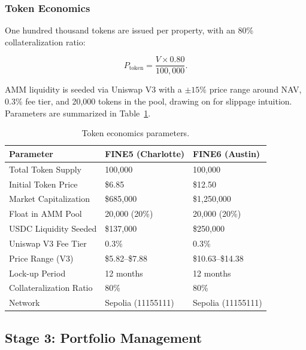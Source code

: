 \documentclass[11pt,letterpaper]{article}
\begin{document}
\subsubsection{Token Economics}

One hundred thousand tokens are issued per property, with an 80\% collateralization ratio:
\begin{eqbox}
\begin{equation}
P_{\text{token}} = \frac{V \times 0.80}{100{,}000}.
\label{eq:token_price}
\end{equation}
\end{eqbox}
AMM liquidity is seeded via Uniswap V3 with a $\pm 15\%$ price range around NAV, 0.3\%
fee tier, and 20{,}000 tokens in the pool, drawing on \citet{angeris2020} for slippage
intuition. Parameters are summarized in Table~\ref{tab:token_params}.

\begin{table}[H]
\centering
\caption{Token economics parameters.}
\label{tab:token_params}
\begin{tabular}{lll}
\toprule
\textbf{Parameter} & \textbf{FINE5 (Charlotte)} & \textbf{FINE6 (Austin)} \\
\midrule
Total Token Supply       & 100{,}000       & 100{,}000       \\
Initial Token Price      & \$6.85          & \$12.50         \\
Market Capitalization    & \$685{,}000     & \$1{,}250{,}000 \\
Float in AMM Pool        & 20{,}000 (20\%) & 20{,}000 (20\%) \\
USDC Liquidity Seeded    & \$137{,}000     & \$250{,}000     \\
Uniswap V3 Fee Tier      & 0.3\%           & 0.3\%           \\
Price Range (V3)         & \$5.82--\$7.88  & \$10.63--\$14.38 \\
Lock-up Period           & 12 months       & 12 months       \\
Collateralization Ratio  & 80\%            & 80\%            \\
Network                  & Sepolia (11155111) & Sepolia (11155111) \\
\bottomrule
\end{tabular}
\end{table}

\subsection{Stage 3: Portfolio Management}
\end{document}
